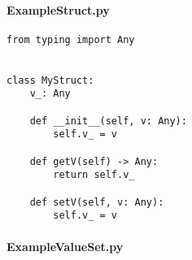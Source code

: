 \paragraph{ExampleStruct.py}

\begin{verbatim}
from typing import Any


class MyStruct:
    v_: Any

    def __init__(self, v: Any):
        self.v_ = v

    def getV(self) -> Any:
        return self.v_

    def setV(self, v: Any):
        self.v_ = v
\end{verbatim}

\paragraph{ExampleValueSet.py}

